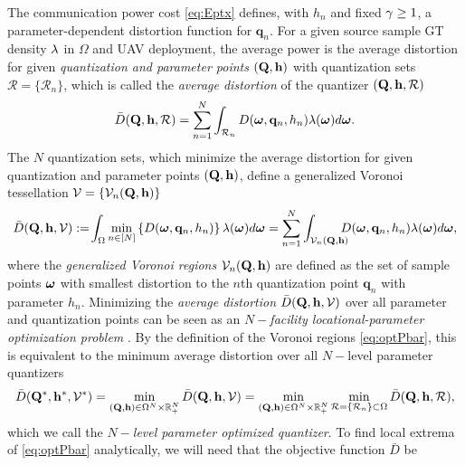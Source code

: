\documentclass[12pt,onecolumn,journal,draftclsnofoot,letterpaper]{IEEEtran}
\renewcommand{\vp}{\mathbf q}
\renewcommand{\vP}{\mathbf Q}
\newcommand{\df}{\ensuremath{\lam}}         %
\newcommand{\bH}{\ensuremath{\vh}}          %
\newcommand{\Vor}{\ensuremath{\mathcal{V}}}         %
\newcommand{\Rset}{\ensuremath{\mathcal R}}
\newcommand{\Dis}{\ensuremath{D}}                    %
\newcommand{\AvDis}{\ensuremath{\bar{\Dis}}}         %
\begin{document}
The communication power cost \eqref{eq:Eptx} defines, with $h_n$ and fixed $\gamma\geq 1$, a parameter-dependent
distortion function for $\vp_n$. For a given source sample GT density $\df$ in $\Omega$ and UAV deployment, the
average power is the average distortion for given \emph{quantization and parameter points} $(\vP,\vh)$ with quantization
sets $\Rset=\{\Rset_n\}$, which is called the \emph{average distortion} of the quantizer $(\vP,\vh,\Rset)$
%
\begin{equation}
 \AvDis(\vP,\vh,\Rset)
  = \sum_{n=1}^N \int_{\Rset_n} D(\vome,\vp_n,h_n)\lam(\vome)d\vome.
  \label{eq:Pbar}
\end{equation}
%
The $N$ quantization sets, which minimize the average distortion for 
given quantization and parameter points $(\vP,\vh)$, define a generalized Voronoi tessellation $\Vor=\{\Vor_n(\vP,\vh)\}$
%
\begin{align}
  \AvDis(\vP,\vh,\Vor)
  :=\!\int_{\Omega}\min_{n\in[N]} \left\{ \Dis(\vome,\vp_n,h_n) \right\} \df(\vome)d\vome 
  =\sum_{n=1}^{N}\int_{\Vor_n(\vP,\vh)}\!\!\!\!\!\Dis(\vome,\vp_n,h_n) \df(\vome)d\vome 
  \label{eq:optPbar},
\end{align}
%
where the \emph{generalized Voronoi regions} $\Vor_n(\vP,\vh)$ are defined as the set of sample points $\boldsymbol{ \omega}$ with
smallest distortion to the $n$th quantization point $\vp_n$ with parameter $h_n$.  Minimizing the
\emph{average distortion} $\AvDis(\vP,\vh,\Vor)$ over all parameter and quantization points can be seen as an
\emph{$N-$facility locational-parameter optimization problem} \cite{GJ, GJcom18, GJ18,OBSC00}. By the definition of the
Voronoi regions \eqref{eq:optPbar}, this is equivalent to the minimum average distortion over all $N-$level parameter
quantizers%
%
\begin{align}
  \AvDis(\vP^*,\vh^*,\Vor^*)
  = \min_{(\vP,\vh)\in\Ome^N\times\R_+^N} \AvDis(\vP,\vh,\Vor)
  = \min_{(\vP,\vh)\in\Ome^N\times\R_+^N} \min_{\Rset=\{\Rset_n\}\subset\Ome} \AvDis(\vP,\vh,\Rset), 
\label{eq:optquanteqoptdeploy}
\end{align}
%
which we call the \emph{$N-$level parameter optimized quantizer}.
%
%
%
To find local extrema of \eqref{eq:optPbar} analytically, we will need that the objective function $\AvDis$ be
\end{document}
